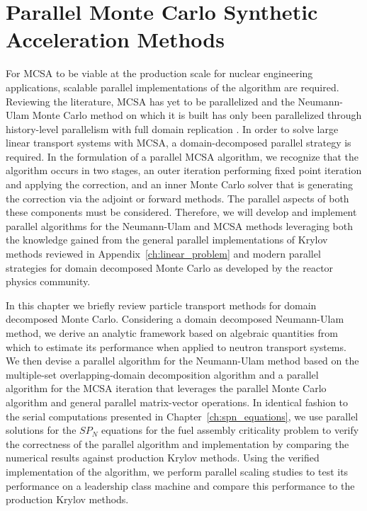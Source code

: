 \chapter{Parallel Monte Carlo Synthetic \\ Acceleration Methods\ }
\label{ch:parallel_methods}
For MCSA to be viable at the production scale for nuclear engineering
applications, scalable parallel implementations of the algorithm are
required. Reviewing the literature, MCSA has yet to be parallelized
and the Neumann-Ulam Monte Carlo method on which it is built has only
been parallelized through history-level parallelism with full domain
replication \citep{alexandrov_efficient_1998}. In order to solve large
linear transport systems with MCSA, a domain-decomposed parallel
strategy is required. In the formulation of a parallel MCSA algorithm,
we recognize that the algorithm occurs in two stages, an outer
iteration performing fixed point iteration and applying the
correction, and an inner Monte Carlo solver that is generating the
correction via the adjoint or forward methods. The parallel aspects of
both these components must be considered. Therefore, we will develop
and implement parallel algorithms for the Neumann-Ulam and MCSA
methods leveraging both the knowledge gained from the general parallel
implementations of Krylov methods reviewed in
Appendix~\ref{ch:linear_problem} and modern parallel strategies for
domain decomposed Monte Carlo as developed by the reactor physics
community.

In this chapter we briefly review particle transport methods for
domain decomposed Monte Carlo. Considering a domain decomposed
Neumann-Ulam method, we derive an analytic framework based on
algebraic quantities from which to estimate its performance when
applied to neutron transport systems. We then devise a parallel
algorithm for the Neumann-Ulam method based on the multiple-set
overlapping-domain decomposition algorithm and a parallel algorithm
for the MCSA iteration that leverages the parallel Monte Carlo
algorithm and general parallel matrix-vector operations. In identical
fashion to the serial computations presented in
Chapter~\ref{ch:spn_equations}, we use parallel solutions for the
$SP_N$ equations for the fuel assembly criticality problem to verify
the correctness of the parallel algorithm and implementation by
comparing the numerical results against production Krylov
methods. Using the verified implementation of the algorithm, we
perform parallel scaling studies to test its performance on a
leadership class machine and compare this performance to the
production Krylov methods.


